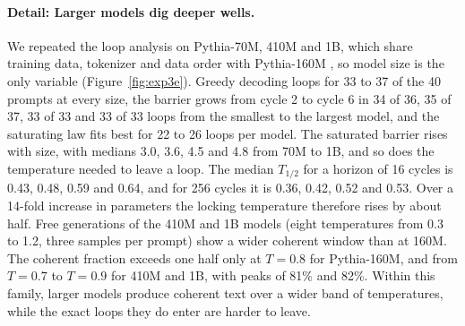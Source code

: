 \paragraph{Detail: Larger models dig deeper wells.} We repeated the loop analysis on Pythia-70M, 410M and 1B, which share training data, tokenizer and data order with Pythia-160M \citep{biderman2023pythia}, so model size is the only variable (Figure~\ref{fig:exp3e}). Greedy decoding loops for 33 to 37 of the 40 prompts at every size, the barrier grows from cycle 2 to cycle 6 in 34 of 36, 35 of 37, 33 of 33 and 33 of 33 loops from the smallest to the largest model, and the saturating law fits best for 22 to 26 loops per model. The saturated barrier rises with size, with medians 3.0, 3.6, 4.5 and 4.8 from 70M to 1B, and so does the temperature needed to leave a loop. The median $T_{1/2}$ for a horizon of 16 cycles is 0.43, 0.48, 0.59 and 0.64, and for 256 cycles it is 0.36, 0.42, 0.52 and 0.53. Over a 14-fold increase in parameters the locking temperature therefore rises by about half. Free generations of the 410M and 1B models (eight temperatures from 0.3 to 1.2, three samples per prompt) show a wider coherent window than at 160M. The coherent fraction exceeds one half only at $T=0.8$ for Pythia-160M, and from $T=0.7$ to $T=0.9$ for 410M and 1B, with peaks of 81\% and 82\%. Within this family, larger models produce coherent text over a wider band of temperatures, while the exact loops they do enter are harder to leave.

